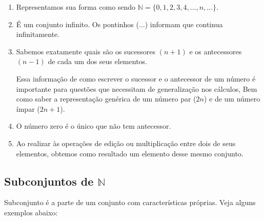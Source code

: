 \documentclass[10pt]{article}
\begin{document}
    \begin{enumerate}[label=\textbf{(\Roman*)}]
        \item Representamos sua forma como sendo \( \mathbb{N} = \{0, 1, 2, 3, 4, \ldots, n, \ldots\}\).
        \item É um conjunto infinito. Os pontinhos (\(\ldots\)) informam que continua infinitamente.
        \item Sabemos exatamente quais são os sucessores \((n+1)\) e os antecessores \((n-1)\) de cada um dos seus elementos.
        
        \begin{obs}
        Essa informação de como escrever o sucessor e o antecessor de um número é importante para questões que necessitam de generalização nos cálculos, Bem como saber a representação genérica de um número par (\(2n\)) e de um número ímpar (\(2n+1\)).
        \end{obs}
        \item O número zero é o único que não tem antecessor.
        \item Ao realizar às operações de edição ou multiplicação entre dois de seus elementos, obtemos como resultado um elemento desse mesmo conjunto.
    \end{enumerate}
\subsection*{Subconjuntos de \( \mathbb{N} \)}
Subconjunto é a parte de um conjunto com características próprias. Veja alguns exemplos abaixo:
\end{document}

